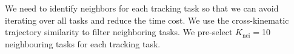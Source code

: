 We need to identify neighbors for each tracking task so that we can avoid iterating over all tasks and reduce the time cost. We use the cross-kinematic trajectory similarity to filter neighboring tasks. We pre-select $K_{\text{nei}}=$10 neighbouring tasks for each tracking task. 




